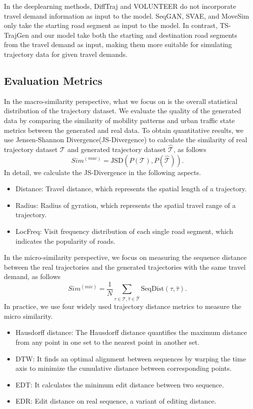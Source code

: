 In the deeplearning methods, DiffTraj and VOLUNTEER do not incorporate travel demand information as input to the model. SeqGAN, SVAE, and MoveSim only take the starting road segment as input to the model. In contrast, TS-TrajGen and our model take both the starting and destination road segments from the travel demand as input, making them more suitable for simulating trajectory data for given travel demands. 

\subsection{Evaluation Metrics}
\label{apdx:metrics}
In the macro-similarity perspective, what we focus on is the overall statistical distribution of the trajectory dataset.
We evaluate the quality of the generated data by comparing the similarity of mobility patterns and urban traffic state metrics between the generated and real data. To obtain quantitative results, we use Jensen-Shannon Divergence(JS-Divergence) to calculate the similarity of real trajectory dataset $\mathcal{T}$ and generated trajectory dataset $\mathcal{\hat{T}}$, as follows
\begin{equation}
    Sim^{(mac)} = \text{JSD}(P(\mathcal{T}), P(\mathcal{\hat{T}})).
\end{equation}
In detail, we calculate the JS-Divergence in the following aspects.
\begin{itemize}
    \item Distance: Travel distance, which represents the spatial length of a trajectory.
    \item Radius: Radius of gyration, which represents the spatial travel range of a trajectory.
    \item LocFreq: Visit frequency distribution of each single road segment, which indicates the popularity of roads.
\end{itemize}

In the micro-similarity perspective, we focus on measuring the
sequence distance between the real trajectories and the generated trajectories with the same travel demand, as follows
\begin{equation}
    Sim^{(mic)} = \frac{1}{N} \sum_{\tau \in \mathcal{T}, \hat{\tau} \in \hat{\mathcal{T}}} \text{SeqDist}(\tau, \hat{\tau}). 
\end{equation}
In practice, we use four widely used trajectory distance metrics to
measure the micro similarity.
\begin{itemize}
    \item Hausdorff distance: The Hausdorff distance quantifies the maximum distance from any point in one set to the nearest point in another set.
    \item DTW: It finds an optimal alignment between sequences by warping the time axis to minimize the cumulative distance between corresponding points.
    \item EDT: It calculates the minimum edit distance between two sequence. 
    \item EDR: Edit distance on real sequence, a variant of editing distance.
\end{itemize}

